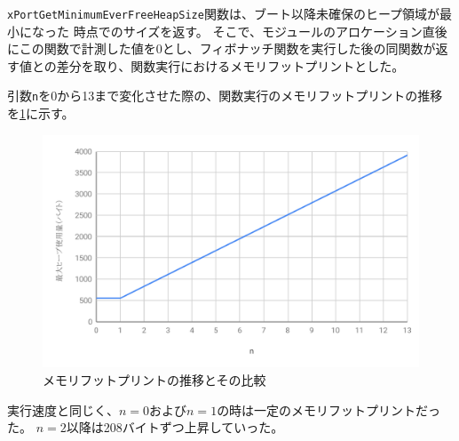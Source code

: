 \verb|xPortGetMinimumEverFreeHeapSize|関数は、ブート以降未確保のヒープ領域が最小になった
時点でのサイズを返す。
そこで、モジュールのアロケーション直後にこの関数で計測した値を0とし、フィボナッチ関数を実行した後の同関数が返す値との差分を取り、関数実行におけるメモリフットプリントとした。

引数\verb|n|を0から13まで変化させた際の、関数実行のメモリフットプリントの推移を\ref{fig:heap_size}に示す。

\begin{figure}[htbp]
  \caption{メモリフットプリントの推移とその比較}
  \label{fig:heap_size}
  \begin{center}
    \includegraphics[bb=0 0 600 370,width=12cm]{img/heap_size.pdf}
  \end{center}
\end{figure}

実行速度と同じく、$n=0$および$n=1$の時は一定のメモリフットプリントだった。
$n=2$以降は208バイトずつ上昇していった。
